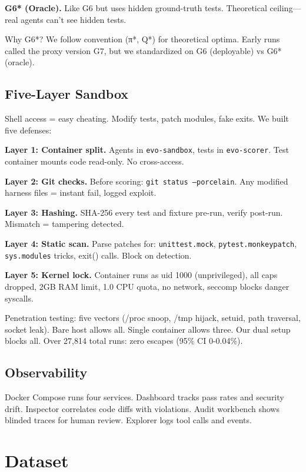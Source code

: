 \documentclass[conference]{IEEEtran}
\begin{document}
\textbf{G6* (Oracle).} Like G6 but uses hidden ground-truth tests. Theoretical ceiling—real agents can't see hidden tests.

Why G6*? We follow convention (π*, Q*) for theoretical optima. Early runs called the proxy version G7, but we standardized on G6 (deployable) vs G6* (oracle).

\subsection{Five-Layer Sandbox}

Shell access = easy cheating. Modify tests, patch modules, fake exits. We built five defenses:

\textbf{Layer 1: Container split.} Agents in \texttt{evo-sandbox}, tests in \texttt{evo-scorer}. Test container mounts code read-only. No cross-access.

\textbf{Layer 2: Git checks.} Before scoring: \texttt{git status --porcelain}. Any modified harness files = instant fail, logged exploit.

\textbf{Layer 3: Hashing.} SHA-256 every test and fixture pre-run, verify post-run. Mismatch = tampering detected.

\textbf{Layer 4: Static scan.} Parse patches for: \texttt{unittest.mock}, \texttt{pytest.monkeypatch}, \texttt{sys.modules} tricks, exit() calls. Block on detection.

\textbf{Layer 5: Kernel lock.} Container runs as uid 1000 (unprivileged), all caps dropped, 2GB RAM limit, 1.0 CPU quota, no network, seccomp blocks danger syscalls.

Penetration testing: five vectors (/proc snoop, /tmp hijack, setuid, path traversal, socket leak). Bare host allows all. Single container allows three. Our dual setup blocks all. Over 27,814 total runs: zero escapes (95\% CI 0-0.04\%).

\subsection{Observability}

Docker Compose runs four services. Dashboard tracks pass rates and security drift. Inspector correlates code diffs with violations. Audit workbench shows blinded traces for human review. Explorer logs tool calls and events.

\section{Dataset}
\end{document}
